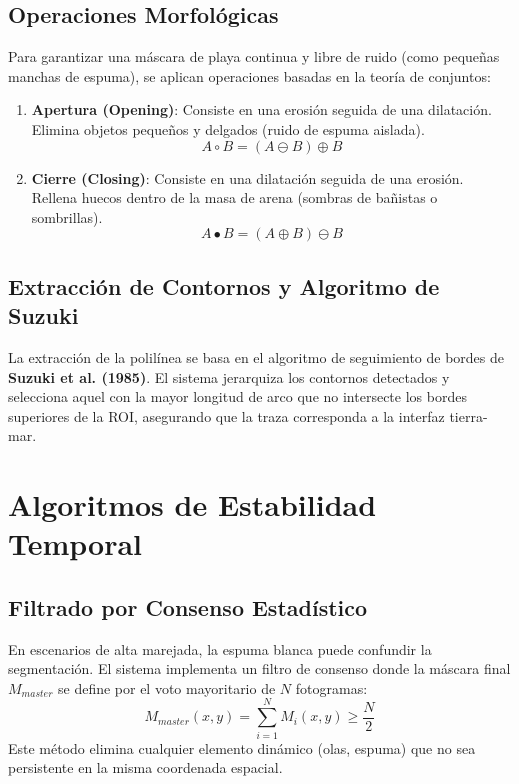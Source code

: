\documentclass[12pt,a4paper]{article}
\begin{document}
\subsection{Operaciones Morfológicas}
Para garantizar una máscara de playa continua y libre de ruido (como pequeñas manchas de espuma), se aplican operaciones basadas en la teoría de conjuntos:

\begin{enumerate}
    \item \textbf{Apertura (Opening)}: Consiste en una erosión seguida de una dilatación. Elimina objetos pequeños y delgados (ruido de espuma aislada).
    \begin{equation}
        A \circ B = (A \ominus B) \oplus B
    \end{equation}
    \item \textbf{Cierre (Closing)}: Consiste en una dilatación seguida de una erosión. Rellena huecos dentro de la masa de arena (sombras de bañistas o sombrillas).
    \begin{equation}
        A \bullet B = (A \oplus B) \ominus B
    \end{equation}
\end{enumerate}

\subsection{Extracción de Contornos y Algoritmo de Suzuki}
La extracción de la polilínea se basa en el algoritmo de seguimiento de bordes de \textbf{Suzuki et al. (1985)}. El sistema jerarquiza los contornos detectados y selecciona aquel con la mayor longitud de arco que no intersecte los bordes superiores de la ROI, asegurando que la traza corresponda a la interfaz tierra-mar.

\section{Algoritmos de Estabilidad Temporal}

\subsection{Filtrado por Consenso Estadístico}
En escenarios de alta marejada, la espuma blanca puede confundir la segmentación. El sistema implementa un filtro de consenso donde la máscara final $M_{master}$ se define por el voto mayoritario de $N$ fotogramas:
\begin{equation}
    M_{master}(x,y) = \sum_{i=1}^{N} M_i(x,y) \geq \frac{N}{2}
\end{equation}
Este método elimina cualquier elemento dinámico (olas, espuma) que no sea persistente en la misma coordenada espacial.
\end{document}

